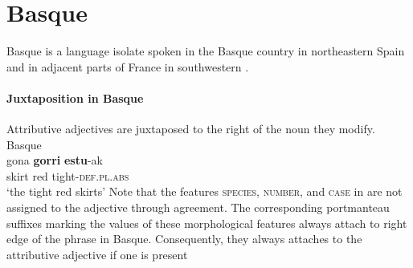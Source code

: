 \section{Basque}
Basque is a language isolate spoken in the Basque country in northeastern Spain and in adjacent parts of France in southwestern . 

\paragraph*{Juxtaposition in Basque}
Attributive adjectives are juxtaposed to the right of the noun they modify.
\ea
\label{basque juxtap}
\rm{Basque \citep[81]{saltarelli1988}}\\
\gll	gona \textbf{gorri} \textbf{estu}-ak\\
	skirt red tight-\textsc{def.pl.abs}\\
\glt	‘the tight red skirts’
\z
Note that the features \textsc{species}, \textsc{number}, and \textsc{case} in  are not assigned to the adjective through agreement. The corresponding portmanteau suffixes marking the values of these morphological features always attach to right edge of the phrase in Basque. Consequently, they always attaches to the attributive adjective if one is present \cite[171]{hualde-etal2003}
